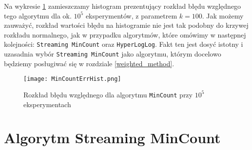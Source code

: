 \newpage 
Na wykresie \ref{fig:mincount_hist} zamieszczamy histogram prezentujący rozkład błędu względnego tego algorytmu dla ok. $10^5$ eksperymentów, z parametrem $k=100$. Jak możemy zauważyć, rozkład wartości błędu na histogramie nie jest tak podobny do krzywej rozkładu normalnego, jak w przypadku algorytmów, które omówimy w następnej kolejności: \texttt{Streaming MinCount} oraz \texttt{HyperLogLog}. Fakt ten jest dosyć istotny i uzasadnia wybór \texttt{Streaming MinCount} jako algorytmu, którym docelowo będziemy posługiwać się w rozdziale \ref{weighted_method}.
\begin{figure}[h!]
	\texttt{[image: MinCountErrHist.png]}
	\centering
	\caption{Rozkład błędu względnego dla algorytmu \texttt{MinCount} przy $10^5$ eksperymentach}
	\label{fig:mincount_hist}
\end{figure}
\newpage

\section{Algorytm Streaming MinCount}
\label{smincount}

